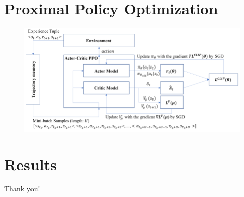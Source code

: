 \documentclass[serif]{beamer}  %
\begin{document}
\section{Proximal Policy Optimization}

\begin{frame}
    \begin{figure}
        \centering
        \includegraphics[width=\linewidth]{images/PPO_diagram.png}
    \end{figure}
\end{frame}

\section{Results}

\begin{frame}
\centering
{\Huge Thank you!}
\end{frame}



\end{document}
